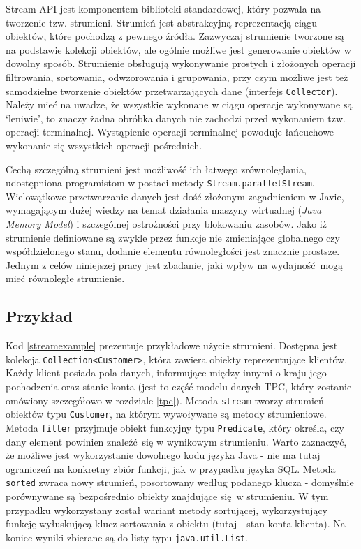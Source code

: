 \documentclass[12pt,twoside,openright]{extarticle}
\begin{document}
    Stream API jest komponentem biblioteki standardowej, który pozwala na tworzenie tzw. strumieni. Strumień jest abstrakcyjną reprezentacją ciągu obiektów, które pochodzą z pewnego źródła. Zazwyczaj strumienie tworzone są na podstawie kolekcji obiektów, ale ogólnie możliwe jest generowanie obiektów w dowolny sposób. Strumienie obsługują wykonywanie prostych i złożonych operacji filtrowania, sortowania, odwzorowania i grupowania, przy czym możliwe jest też samodzielne tworzenie obiektów przetwarzających dane (interfejs \texttt{Collector}). Należy mieć na uwadze, że wszystkie wykonane w ciągu operacje wykonywane są `leniwie', to znaczy żadna obróbka danych nie zachodzi przed wykonaniem tzw. operacji terminalnej. Wystąpienie operacji terminalnej powoduje łańcuchowe wykonanie się wszystkich operacji pośrednich.

    Cechą szczególną strumieni jest możliwość ich łatwego zrównoleglania, udostępniona programistom w postaci metody \texttt{Stream.parallelStream}. Wielowątkowe przetwarzanie danych jest dość złożonym zagadnieniem w Javie, wymagającym dużej wiedzy na temat działania maszyny wirtualnej (\textit{Java Memory Model}) i szczególnej ostrożności przy blokowaniu zasobów. Jako iż strumienie definiowane są zwykle przez funkcje nie zmieniające globalnego czy współdzielonego stanu, dodanie elementu równoległości jest znacznie prostsze. Jednym z celów niniejszej pracy jest zbadanie, jaki wpływ na wydajność mogą mieć równoległe strumienie.

\subsection{Przykład}

    Kod \ref{streamexample} prezentuje przykładowe użycie strumieni. Dostępna jest kolekcja \newline \texttt{Collection<Customer>}, która zawiera obiekty reprezentujące klientów. Każdy klient posiada pola danych, informujące między innymi o kraju jego pochodzenia oraz stanie konta (jest to część modelu danych TPC, który zostanie omówiony szczegółowo w rozdziale \ref{tpc}). Metoda \texttt{stream} tworzy strumień obiektów typu \texttt{Customer}, na którym wywoływane są metody strumieniowe. Metoda \texttt{filter} przyjmuje obiekt funkcyjny typu \texttt{Predicate}, który określa, czy dany element powinien znaleźć się w wynikowym strumieniu. Warto zaznaczyć, że możliwe jest wykorzystanie dowolnego kodu języka Java - nie ma tutaj ograniczeń na konkretny zbiór funkcji, jak w przypadku języka SQL. Metoda \texttt{sorted} zwraca nowy strumień, posortowany według podanego klucza - domyślnie porównywane są bezpośrednio obiekty znajdujące się w strumieniu. W tym przypadku wykorzystany został wariant metody sortującej, wykorzystujący funkcję wyłuskującą klucz sortowania z obiektu (tutaj - stan konta klienta). Na koniec wyniki zbierane są do listy typu \texttt{java.util.List}. 
\end{document}
